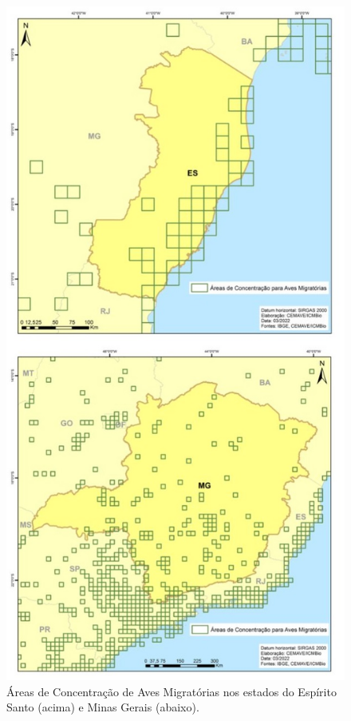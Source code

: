 \documentclass[
  oneside]{scrbook}
\begin{document}
\begin{figure}[H]

{\centering \includegraphics[width=0.7\linewidth]{imagens/cap07/Fig_19_ES_MG} 

}

\caption{Áreas de Concentração de Aves Migratórias nos estados do Espírito Santo (acima) e Minas Gerais (abaixo).}\label{fig:39}
\end{figure}
\end{document}
